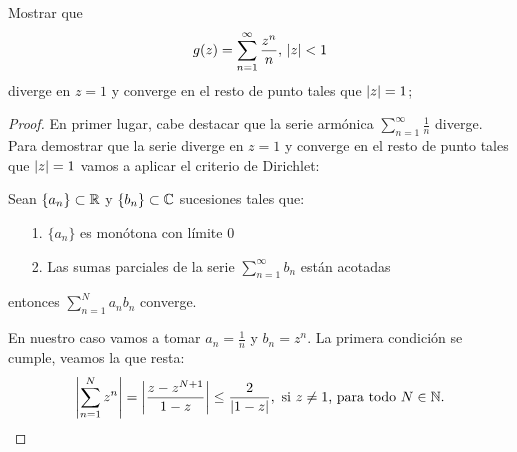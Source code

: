 
\begin{example}
    Mostrar que
    \begin{equation*}
        g(z) = \sum_{n=1}^{\infty} \frac{z^n}{n}, \, \left\lvert z\right\rvert < 1
    \end{equation*}
    diverge en $z = 1$  y converge en el resto de punto tales que $\left\lvert z\right\rvert = 1$;

\end{example}

\begin{proof}
    En primer lugar, cabe destacar que la serie armónica $\sum_{n=1}^{\infty} \frac{1}{n}$ diverge. Para demostrar que la serie diverge en $z = 1$  y converge en el resto de punto tales que $\left\lvert z\right\rvert = 1$ vamos a aplicar el criterio de Dirichlet: \\ \par

    Sean $\{a_n\} \subset \mathbb{R}$ y $\{b_n\} \subset \mathbb{C}$ sucesiones tales que:
    \begin{itemize}
        \item[1.] $\{a_n\}$ es monótona con límite $0$
        \item[2.] Las sumas parciales de la serie $\sum_{n=1}^{\infty} b_n$ están acotadas
    \end{itemize}
    entonces $\sum_{n=1}^{N} a_nb_n$ converge. \\ \par

    En nuestro caso vamos a tomar $a_n = \frac{1}{n}$ y $b_n = z^n$. La primera condición se cumple, veamos la que resta:
    \begin{equation*}
        \left\lvert\sum_{n=1}^{N} z^n\right\rvert = \left\lvert\frac{z - z^{N+1}}{1 - z}\right\rvert \leq \frac{2}{\left\lvert1 - z\right\rvert}, \text{ si } z \neq 1 \text{, para todo } N \in \mathbb{N}.
    \end{equation*}


\end{proof}
